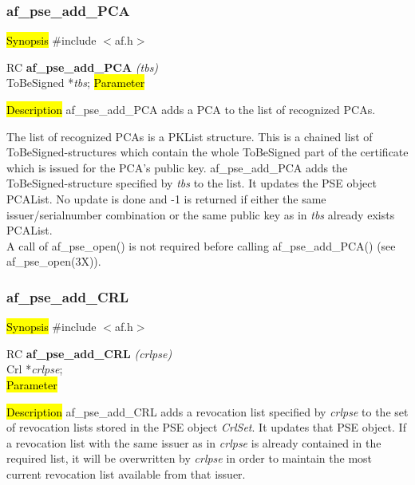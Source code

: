 \subsubsection{af\_pse\_add\_PCA}
\label{af_add_PCA}
\hl{Synopsis}
\#include $<$af.h$>$

RC {\bf af\_pse\_add\_PCA} {\em (tbs)} \\
ToBeSigned *{\em tbs};
\hl{Parameter}

\hl{Description}
af\_pse\_add\_PCA adds a PCA to the list of recognized PCAs. 

The list of recognized PCAs is a PKList structure.
This is a chained list of ToBeSigned-structures which contain the
whole ToBeSigned part of the certificate which is issued for the PCA's public key.
af\_pse\_add\_PCA adds the ToBeSigned-structure specified by {\em tbs} to the list.
It updates the PSE object PCAList. No update is done and -1 is returned if
either the same issuer/serialnumber combination or the same public key as in {\em tbs}
already exists PCAList.
\\ [1em]
A call of af\_pse\_open() is not required before calling af\_pse\_add\_PCA()
(see af\_pse\_open(3X)).


\subsubsection{af\_pse\_add\_CRL}
\label{af_add_CRL}
\hl{Synopsis}
\#include $<$af.h$>$ 

RC {\bf af\_pse\_add\_CRL} {\em (crlpse)} \\
Crl *{\em crlpse}; \\
\hl{Parameter}

\hl{Description}
af\_pse\_add\_CRL adds a revocation list specified by {\em crlpse} to the set
of revocation lists stored in the PSE object {\em CrlSet}. It updates that PSE object. 
If a revocation list with the same issuer as in {\em crlpse} is already contained 
in the required list, it will be overwritten by {\em crlpse} in order to maintain
the most current revocation list available from that issuer.


